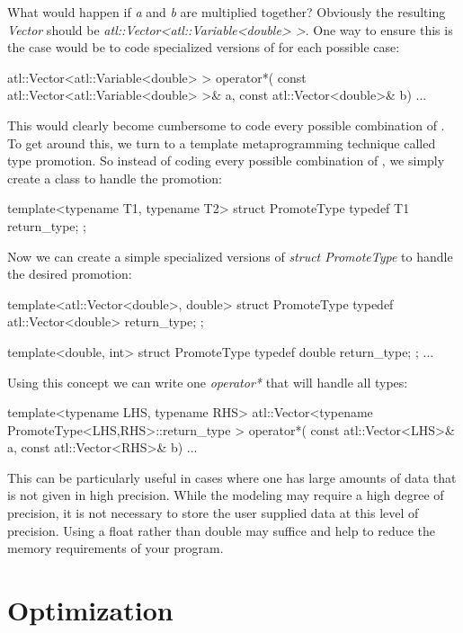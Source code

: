 \documentclass[12pt,a4paper]{article}
\begin{document}
What would happen if \textit{a} and \textit{b} are multiplied together? Obviously the resulting \textit{Vector} should be \textit{atl::Vector<atl::Variable<double> >}. One way to ensure this is the case would be to code specialized versions of 
 for each possible case:
\begin{cppsource}
atl::Vector<atl::Variable<double> > operator*(
      const atl::Vector<atl::Variable<double> >& a, const atl::Vector<double>& b)
{
    ...
}
\end{cppsource}
This would clearly become cumbersome to code every possible combination of . To get around this, we turn to a template metaprogramming technique called type promotion. So instead of coding every possible combination of ,
we simply create a class to handle the promotion:
\begin{cppsource}

    template<typename T1, typename T2>
    struct PromoteType {
         typedef T1 return_type;
    };    
\end{cppsource}
Now we can create a simple specialized versions of \textit{struct PromoteType} to handle the desired promotion:

\begin{cppsource}

    template<atl::Vector<double>, double>
    struct PromoteType {
         typedef atl::Vector<double> return_type;
    };    
    
    template<double, int>
    struct PromoteType {
         typedef double return_type;
    };    
    ...
\end{cppsource}

Using this concept we can write one \textit{operator*} that will handle all types:

\begin{cppsource}
 template<typename LHS, typename RHS>
 atl::Vector<typename PromoteType<LHS,RHS>::return_type > operator*(
      const atl::Vector<LHS>& a, const atl::Vector<RHS>& b)
 {
    ...
 }
 \end{cppsource}
This can be particularly useful in cases where one has large amounts of data that is not given in high precision.  While the modeling may require a high degree of precision, it is not necessary to store the user supplied data at this level of precision. Using a float rather than double may suffice and help to reduce the memory requirements of your program.
\section{Optimization}
\end{document}
